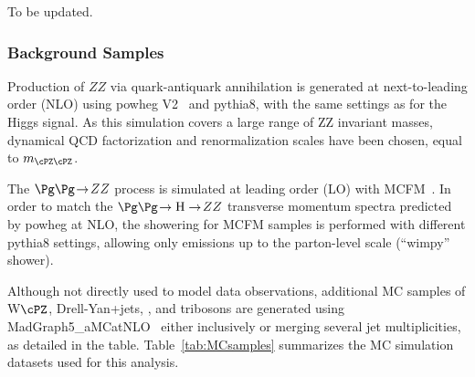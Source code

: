  \label{madgraph5}

To be updated.


\subsubsection{Background Samples}

Production of $ZZ$ via quark-antiquark annihilation is generated at
next-to-leading order (NLO) using {\sc powheg V2}~\cite{Nason:2013ydw}
and {\sc pythia8}, with 
the same settings as for the Higgs signal. As this simulation covers a large
range of ZZ invariant masses, dynamical QCD factorization and renormalization
scales have been chosen, equal to $m_{\cPZ\cPZ}$. 

The $\Pg\Pg \! \to \! ZZ$ process is simulated at leading order (LO) 
with MCFM~\cite{MCFM,Campbell:2013una}. In order to match the 
$\Pg\Pg \! \to \mathrm{H} \to \! ZZ$ transverse momentum spectra predicted 
by {\sc powheg} at NLO, the showering for MCFM samples is performed with 
different {\sc pythia8} settings, allowing only emissions up to the parton-level scale
(``wimpy'' shower).

Although not directly used to model data observations, additional 
MC samples of W$\cPZ$, Drell-Yan+jets, \ttbar, and tribosons are
generated using {\sc MadGraph5\_aMCatNLO}~\cite{Alwall:2014hca} either
inclusively or merging several jet multiplicities, as detailed in the table.
Table~\ref{tab:MCsamples} summarizes the MC simulation datasets used for this analysis. 


